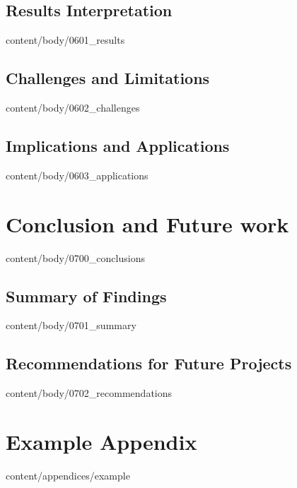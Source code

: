 \documentclass[english, tfg, loc, lof, covers, printable, firstnumbered, epsbased]{tfgtfmthesisuam}
\begin{document}
  \section{Results Interpretation}{content/body/0601_results}
  \section{Challenges and Limitations}{content/body/0602_challenges}
  \section{Implications and Applications}{content/body/0603_applications}
  
\chapter{Conclusion and Future work}{content/body/0700_conclusions}
  \section{Summary of Findings}{content/body/0701_summary}
  \section{Recommendations for Future Projects}{content/body/0702_recommendations}

\appendix

\chapter{Example Appendix}{content/appendices/example}
\end{document}
